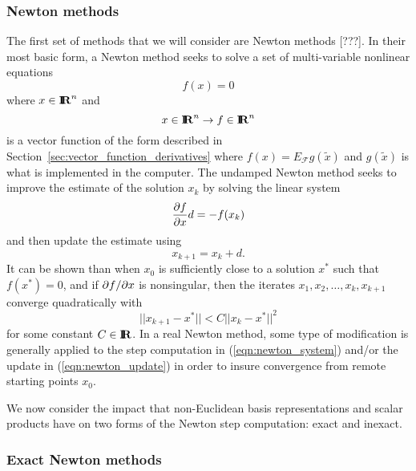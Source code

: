 \subsubsection{Newton methods}

The first set of methods that we will consider are Newton methods [???].  In
their most basic form, a Newton method seeks to solve a set of multi-variable
nonlinear equations
%
\[
f(x) = 0
\]
%
where $x\in\mbox{\textbf{I}}\hspace{-0.6ex}\mbox{\textbf{R}}^n$ and
%
\[
x\in\mbox{\textbf{I}}\hspace{-0.6ex}\mbox{\textbf{R}}^n \rightarrow f\in\mbox{\textbf{I}}\hspace{-0.6ex}\mbox{\textbf{R}}^n
\]
%
is a vector function of the form described in
Section~\ref{sec:vector_function_derivatives} where $f(x) = E_{\mathcal{F}}
g(\tilde{x})$ and $g(\tilde{x})$ is what is implemented in the computer.  The
undamped Newton method seeks to improve the estimate of the solution $x_k$ by
solving the linear system
%
\begin{equation}
\displaystyle{\frac{\partial f}{\partial x}} d = - f(x_k)
\label{eqn:newton_system}
\end{equation}
%
and then update the estimate using
%
\begin{equation}
x_{k+1} = x_k + d.
\label{eqn:newton_update}
\end{equation}
%
It can be shown than when $x_0$ is sufficiently close to a solution $x^*$ such
that $f(x^*)=0$, and if $\partial f / \partial x$ is nonsingular, then the iterates $x_1,
x_2, {}\ldots, x_k, x_{k+1}$ converge quadratically with
%
\[
||x_{k+1}-x^*|| < C ||x_k-x^*||^2
\]
for some constant $C\in\mbox{\textbf{I}}\hspace{-0.6ex}\mbox{\textbf{R}}$.  In a real Newton method, some type of
modification is generally applied to the step computation in
(\ref{eqn:newton_system}) and/or the update in (\ref{eqn:newton_update}) in
order to insure convergence from remote starting points $x_0$.

We now consider the impact that non-Euclidean basis representations and scalar
products have on two forms of the Newton step computation: exact and inexact.

\subsubsection*{Exact Newton methods}

